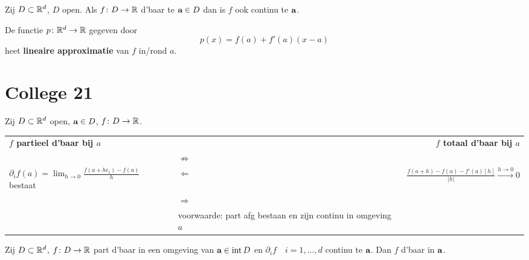 \documentclass{2wa40summary}
\begin{document}
	\theorem Zij $D \subset \mathbb{R}^d$, $D$ open. Als $f\colon D \to \mathbb{R}$ d'baar te ${\textbf{a}} \in D$ dan is $f$ ook continu te ${\textbf{a}}$.
      		
	 De functie $ p\colon  \mathbb{R}^d \to \mathbb{R} $ gegeven door \[p(x)=f(a)+f'(a)(x-a)\] heet \textbf{lineaire approximatie} van $ f $ in/rond $ a $.
	\newpage	
	\section{College 21}
		Zij $D \subset \mathbb{R}^d$ open, ${\textbf{a}}\in D$, $f\colon D \to \mathbb{R}$.

		
    	\begin{tabular}{l p{3cm} r}
    		\textbf{$f$ partieel d'baar bij $a$} & & \textbf{$f$ totaal d'baar bij $a$} \\
    		& \center $\not\Rightarrow$ & \\
 			$\partial_i f(a)= \lim_{h \to 0} \frac{f(a+he_i)-f(a)}{h}$ bestaat & \center $\Leftarrow$ & $\frac{f(a+h)-f(a)-f'(a)[h]}{|h|}\stackrel{h \to 0}{\to} 0$ \\
 			& \center $\Rightarrow$ & \\
 			& voorwaarde: part afg bestaan en zijn continu in omgeving $a$& \\   		
		\end{tabular}
		\theorem[K 10.4.5] Zij $D\subset\mathbb{R}^d$, $f\colon D\to\mathbb{R}$ part d'baar in een omgeving van ${\textbf{a}} \in \operatorname{\mathop{int}} D$ en $\partial_i f \quad i=1,\dots ,d$ continu te ${\textbf{a}}$. Dan $f$ d'baar in ${\textbf{a}}$.
		
\end{document}
